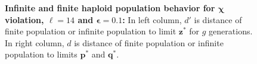 \begin{figure}[h]
\begin{center}
\hspace{-3em}%
\vspace{-0.5em} \hspace{-3em}%

\caption[\textbf{Infinite and finite haploid population behavior for $\bm{\chi}$ violation, $\ell = 14$ and $\bm{\epsilon} = 0.1$}]
{\textbf{Infinite and finite haploid population behavior for $\bm{\chi}$ violation, $\ell = 14$ and $\bm{\epsilon} = 0.1$:} 
  In left column, $d'$ is distance of finite population or infinite population to limit $\bm{z}^\ast$ for $g$ generations. 
  In right column, $d$ is distance of finite population or infinite population to limits $\bm{p}^\ast$ and $\bm{q}^\ast$.}
\label{oscillation_14h_vio_chi_0.1}
\end{center}
\end{figure}

